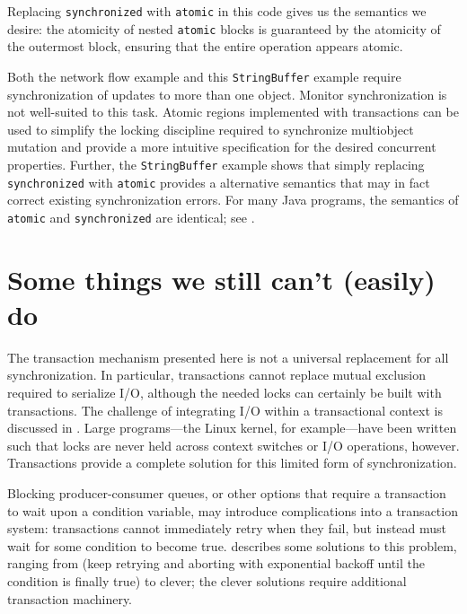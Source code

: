 Replacing {\tt synchronized} with {\tt atomic} in
this code gives us the semantics
we desire: the atomicity of nested {\tt atomic} blocks is guaranteed
by the atomicity of the outermost block, ensuring that the entire
operation appears atomic.

Both the network flow example and this {\tt StringBuffer} example require
synchronization of
updates to more than one object.
Monitor synchronization is not
well-suited to this task.  Atomic regions implemented with
transactions can be used to simplify the locking discipline required
to synchronize multiobject mutation
and provide a more intuitive specification for the desired
concurrent properties.  Further, the {\tt StringBuffer} example shows
that simply replacing {\tt synchronized} with {\tt atomic} provides a
alternative semantics that may in fact correct existing
synchronization errors.
For many Java programs, the
semantics of {\tt atomic} and {\tt synchronized} are identical; see
.

\section{Some things we still can't (easily) do}\label{sec:xlimit}
The transaction mechanism presented here is not a universal
replacement for all synchronization.  In particular, transactions
cannot replace mutual exclusion
required to serialize I/O, although the needed locks can certainly be
built with transactions.  
The challenge of integrating I/O within a
transactional context is discussed in .
Large programs---the
Linux kernel, for example---have been
written such that locks are
never held across context switches or I/O operations, however.  Transactions
provide a complete solution for this limited form of synchronization.

Blocking producer-consumer queues, or other options that require a
transaction to wait upon a condition variable, may introduce
complications into a transaction system: transactions cannot
immediately retry when they fail, but instead must wait for some
condition to become true.   describes some
solutions to this problem, ranging from \naive (keep retrying and
aborting with exponential backoff until the condition is finally true)
to clever; the clever solutions require additional transaction
machinery.



